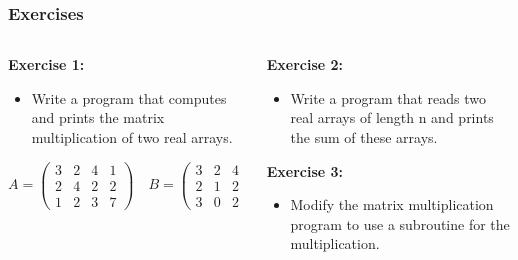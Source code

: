 \documentclass[10pt,aspectratio=169]{beamer}
\begin{document}
\begin{frame}[fragile]
  \frametitle{Exercises}
  \begin{columns}[T]
    \begin{column}{0.5\textwidth}
      \textbf{Exercise 1:}
      \begin{itemize}
        \item Write a program that computes and prints the matrix multiplication of two real arrays.
      \end{itemize}
      \vspace*{0.2cm}
      \[
      A = \begin{pmatrix}
      3 & 2 & 4 & 1 \\
      2 & 4 & 2 & 2 \\
      1 & 2 & 3 & 7
      \end{pmatrix}
      \quad
      B = \begin{pmatrix}
      3 & 2 & 4 \\
      2 & 1 & 2 \\
      3 & 0 & 2
      \end{pmatrix}
      \]
    \end{column}

    \begin{column}{0.5\textwidth}
      \textbf{Exercise 2:}
      \begin{itemize}
        \item Write a program that reads two real arrays of length n and prints the sum of these arrays.
      \end{itemize}

      \textbf{Exercise 3:}
      \begin{itemize}
        \item Modify the matrix multiplication program to use a subroutine for the multiplication.
      \end{itemize}
    \end{column}
  \end{columns}
\end{frame}
\end{document}
